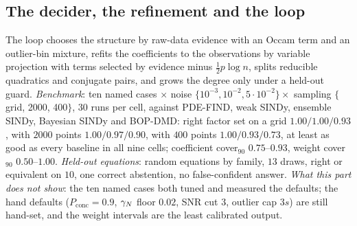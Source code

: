 \subsection{The decider, the refinement and the loop}\label{sec:decider}
The loop chooses the structure by raw-data evidence with an Occam term and an outlier-bin mixture, refits the coefficients to the observations by variable projection with terms selected by evidence minus $\tfrac12p\log n$, splits reducible quadratics and conjugate pairs,
and grows the degree only under a held-out guard. \emph{Benchmark}: ten named cases $\times$ noise $\{10^{-3},10^{-2},5\cdot10^{-2}\}\times$ sampling $\{$grid, 2000, 400$\}$, $30$ runs per cell, against PDE-FIND, weak SINDy, ensemble SINDy, Bayesian SINDy and BOP-DMD:
right factor set on a grid $1.00/1.00/0.93$, with $2000$ points $1.00/0.97/0.90$, with $400$ points $1.00/0.93/0.73$, at least as good as every baseline in all nine cells; coefficient cover$_{90}$ $0.75$--$0.93$, weight cover$_{90}$ $0.50$--$1.00$.
\emph{Held-out equations}: random equations by family, $13$ draws, right or equivalent on $10$, one correct abstention, no false-confident answer.
\emph{What this part does not show}: the ten named cases both tuned and measured the defaults; the hand defaults ($P_{\mathrm{conc}}=0.9$, $\gamma_{N}$ floor $0.02$, SNR cut $3$, outlier cap $3s$) are still hand-set, and the weight intervals are the least calibrated output.
